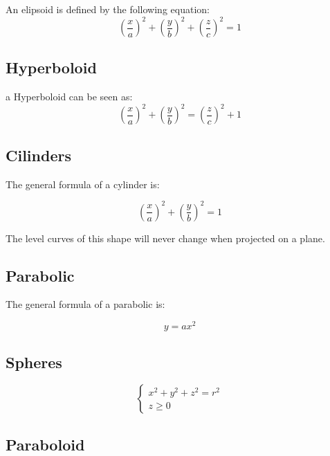 \documentclass[11pt,fleqn]{book} %
\begin{document}
An elipsoid is defined by the following equation:
\begin{equation}
    (\frac{x}{a})^2+(\frac{y}{b})^2+(\frac{z}{c})^2 = 1
\end{equation}


\subsection{Hyperboloid}

a Hyperboloid can be seen as:
\begin{equation}
    (\frac{x}{a})^2+(\frac{y}{b})^2 = (\frac{z}{c})^2 + 1
\end{equation}

\subsection{Cilinders}

The general formula of a cylinder is:

\begin{equation}
    (\frac{x}{a})^2+(\frac{y}{b})^2 = 1
\end{equation}

The level curves of this shape will never change when projected on a plane.

\subsection{Parabolic}

The general formula of a parabolic is:

\begin{equation}
    y = ax^2
\end{equation}

\subsection{Spheres}

\begin{equation}
    \begin{cases}
        x^2+y^2+z^2 = r^2 \\
        z \geq 0
    \end{cases}
\end{equation}

\subsection{Paraboloid}
\end{document}
